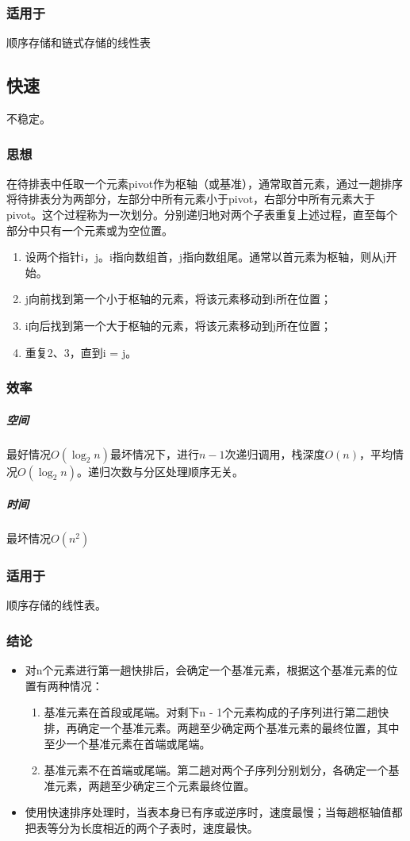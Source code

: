 \subsubsection{适用于}
顺序存储和链式存储的线性表


\subsection{快速}
不稳定。

\subsubsection{思想}
在待排表中任取一个元素pivot作为枢轴（或基准），通常取首元素，通过一趟排序将待排表分为两部分，左部分中所有元素小于pivot，右部分中所有元素大于pivot。这个过程称为一次划分。分别递归地对两个子表重复上述过程，直至每个部分中只有一个元素或为空位置。
\begin{enumerate}
    \item 设两个指针i，j。i指向数组首，j指向数组尾。通常以首元素为枢轴，则从j开始。
    \item j向前找到第一个小于枢轴的元素，将该元素移动到i所在位置；
    \item i向后找到第一个大于枢轴的元素，将该元素移动到j所在位置；
    \item 重复2、3，直到i = j。
\end{enumerate}


\subsubsection{效率}

\subparagraph{空间}
最好情况\(O(\log_2n)\)最坏情况下，进行\(n - 1\)次递归调用，栈深度\(O(n)\)，平均情况\(O(\log_2n)\)。递归次数与分区处理顺序无关。

\subparagraph{时间}
最坏情况\(O(n^2)\)


\subsubsection{适用于}
顺序存储的线性表。


\subsubsection{结论}
\begin{itemize}
    \item 对n个元素进行第一趟快排后，会确定一个基准元素，根据这个基准元素的位置有两种情况：\begin{enumerate}
    \item 基准元素在首段或尾端。对剩下n - 1个元素构成的子序列进行第二趟快排，再确定一个基准元素。两趟至少确定两个基准元素的最终位置，其中至少一个基准元素在首端或尾端。
    \item 基准元素不在首端或尾端。第二趟对两个子序列分别划分，各确定一个基准元素，两趟至少确定三个元素最终位置。
    \end{enumerate}
    \item 使用快速排序处理时，当表本身已有序或逆序时，速度最慢；当每趟枢轴值都把表等分为长度相近的两个子表时，速度最快。
\end{itemize}


